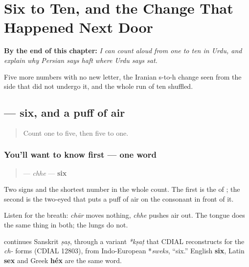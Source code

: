 
\chapter{Six to Ten, and the Change That Happened Next Door}
\label{ch:ur-count-ten}

\begin{chapteropening}
\textbf{By the end of this chapter:} \emph{I can count aloud from one to ten in Urdu, and explain why Persian says haft where Urdu says sat.}

Five more numbers with no new letter, the Iranian s-to-h change seen from the side that did not undergo it, and the whole run of ten shuffled.
\end{chapteropening}

\section[\texorpdfstring{\ur{چھ} (chhe)}{چھ (chhe)}]{ — six, and a puff of air}

\label{lesson:UR-C29-chhe}



\begin{quote}
Count one to five, then five to one.
\end{quote}

\subsection*{You'll want to know first — one word}
\begin{quote}
\textbf{} — \emph{chhe} — \textbf{six}
\end{quote}

Two signs and the shortest number in the whole count. The first is the \textbf{} of \textbf{}; the second is the two-eyed \textbf{} that puts a puff of air on the consonant in front of it.

Listen for the breath: \emph{chār} moves nothing, \emph{chhe} pushes air out. The tongue does the same thing in both; the lungs do not.

\begin{cousinweb}
\textbf{} continues Sanskrit \emph{ṣaṣ}, through a variant \emph{*kṣaṭ} that CDIAL reconstructs for the \emph{ch-} forms (CDIAL 12803), from Indo-European *\emph{sweks}, \textquotedblleft{}six.\textquotedblright{} English \textbf{six}, Latin \textbf{sex} and Greek \textbf{héx} are the same word.
\end{cousinweb}


